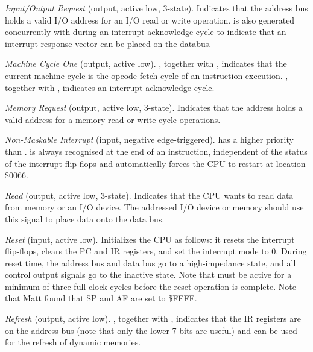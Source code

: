 \begin{description}[leftmargin=1.5em]
	\item[\NoLinkChipPinLabel{IORQ}]
	{\em Input/Output Request} (output, active low, 3-state). Indicates that the address bus holds a valid I/O address for an I/O read or write operation.  is also generated concurrently with  during an interrupt acknowledge cycle to indicate that an interrupt response vector can be placed on the databus.

	\item[\NoLinkChipPinLabel{M1}]
	{\em Machine Cycle One} (output, active low). , together with , indicates that the current machine cycle is the opcode fetch cycle of an instruction execution. , together with , indicates an interrupt acknowledge cycle.

	\item[\NoLinkChipPinLabel{MREQ}]
	{\em Memory Request} (output, active low, 3-state). Indicates that the address holds a valid address for a memory read or write cycle operations.

	\item[\NoLinkChipPinLabel{NMI}]
	{\em Non-Maskable Interrupt} (input, negative edge-triggered).  has a higher priority than .  is always recognised at the end of an instruction, independent of the status of the interrupt flip-flops and automatically forces the CPU to restart at location \$0066.

	\item[\NoLinkChipPinLabel{RD}]
	{\em Read} (output, active low, 3-state). Indicates that the CPU wants to read data from memory or an I/O device. The addressed I/O device or memory should use this signal to place data onto the data bus.

	\item[\NoLinkChipPinLabel{RESET}]
	{\em Reset} (input, active low). Initializes the CPU as follows: it resets the interrupt flip-flops, clears the PC and IR registers, and set the interrupt mode to 0. During reset time, the address bus and data bus go to a high-impedance state, and all control output signals go to the inactive state. Note that  must be active for a minimum of three full clock cycles before the reset operation is complete. Note that Matt found that SP and AF are set to \$FFFF.

	\item[\NoLinkChipPinLabel{RFSH}]
	{\em Refresh} (output, active low). , together with , indicates that the IR registers are on the address bus (note that only the lower 7 bits are useful) and can be used for the refresh of dynamic memories.


\end{description}
